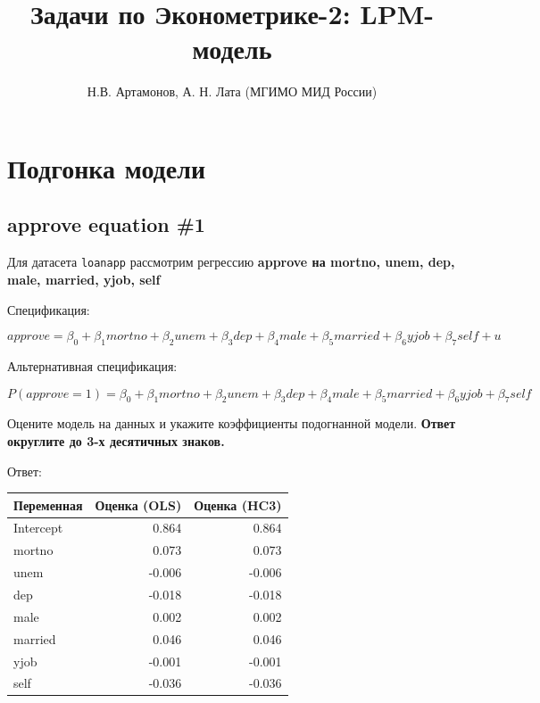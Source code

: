 \documentclass[
  russian,
]{article}
\title{Задачи по Эконометрике-2: LPM-модель}
\author{Н.В. Артамонов, А. Н. Лата (МГИМО МИД России)}
\date{}
\newcounter{none} %
\renewcommand*\contentsname{Содержание}
\newcommand\contentsname{Содержание}
\begin{document}
\maketitle

\renewcommand*\contentsname{Содержание}
{
\setcounter{tocdepth}{3}
\tableofcontents
}

\section{Подгонка
модели}\label{ux43fux43eux434ux433ux43eux43dux43aux430-ux43cux43eux434ux435ux43bux438}

\subsection{approve equation \#1}\label{approve-equation-1}

Для датасета \texttt{loanapp} рассмотрим регрессию \textbf{approve на
mortno, unem, dep, male, married, yjob, self}

Спецификация:

\begin{equation}
approve=\beta_0 + \beta_1 mortno+\beta_2 unem + \beta_3 dep + \beta_4 male + \beta_5 married + \beta_6 yjob + \beta_7 self + u
\end{equation}

Альтернативная спецификация:

\begin{equation}
P(approve=1)=\beta_0+\beta_1mortno+\beta_2unem+\beta_3dep+\beta_4male+\beta_5married+\beta_6yjob+\beta_7self
\end{equation}

Оцените модель на данных и укажите коэффициенты подогнанной модели.
\textbf{Ответ округлите до 3-х десятичных знаков.}

Ответ:

{\def\LTcaptype{none} %
\begin{longtable}[]{@{}lrr@{}}
\toprule\noalign{}
Переменная & Оценка (OLS) & Оценка (HC3) \\
\midrule\noalign{}
\endhead
\bottomrule\noalign{}
\endlastfoot
Intercept & 0.864 & 0.864 \\
mortno & 0.073 & 0.073 \\
unem & -0.006 & -0.006 \\
dep & -0.018 & -0.018 \\
male & 0.002 & 0.002 \\
married & 0.046 & 0.046 \\
yjob & -0.001 & -0.001 \\
self & -0.036 & -0.036 \\
\end{longtable}
}
\end{document}

